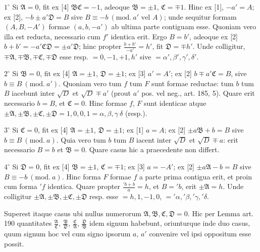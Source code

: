 $1^\circ$ Si $\mathfrak{A}=0$, fit ex [4] $\mathfrak{B}\mathfrak{C}=-1$, adeoque $\mathfrak{B}=\pm1$, $\mathfrak{C}=\mp1$. Hinc ex [1], $-a'=A$; ex [2], $-b\pm a'\mathfrak{D}=B$ sive $B\equiv-b\ (\mathrm{mod.}\ a'\text{ vel }A)$; unde sequitur formam $(A,B,-A')$ formae $(a,b,-a')$ ab ultima parte contiguam esse. Quoniam vero illa est reducta, necessario cum $f'$ identica erit. Ergo $B=b'$, adeoque ex [2] $b+b'=-a'\mathfrak{C}\mathfrak{D}=\pm a'\mathfrak{D}$; hinc propter $\frac{b+b'}{-a'}=h'$, fit $\mathfrak{D}=\mp h'$. Unde colligitur, $\mp\mathfrak{A},\mp\mathfrak{B},\mp\mathfrak{C},\mp\mathfrak{D}$ esse resp. $=0,-1,+1,h'$ sive $=\alpha',\beta',\gamma',\delta'$.

$2^\circ$ Si $\mathfrak{B}=0$, fit ex [4] $\mathfrak{A}=\pm1$, $\mathfrak{D}=\pm1$; ex [3] $a'=A'$; ex [2] $b\mp a'\mathfrak{C}=B$, sive $b\equiv B\ (\mathrm{mod.}\ a')$. Quoniam vero tum $f$ tum $F$ sunt formae reductae: tum $b$ tum $B$ iacebunt inter $\surd D$ et $\surd D\mp a'$ (prout $a'$ pos. vel neg., art. 185, 5). Quare erit necessario $b=B$, et $\mathfrak{C}=0$. Hinc formae $f$, $F$ sunt identicae atque $\pm\mathfrak{A},\pm\mathfrak{B},\pm\mathfrak{C},\pm\mathfrak{D}=1,0,0,1=\alpha,\beta,\gamma\ \delta$ (resp.).

$3^\circ$ Si $\mathfrak{C}=0$, fit ex [4] $\mathfrak{A}=\pm1$, $\mathfrak{D}=\pm1$; ex [1] $a=A$; ex [2] $\pm a\mathfrak{B}+b=B$ sive $b\equiv B\ (\mathrm{mod.}\ a)$. Quia vero tum $b$ tum $B$ iacent inter $\surd D$
et $\surd D\mp a$: erit necessario $B=b$ et $\mathfrak{B}=0$. Quare casus hic a praecedente non differt.

$4^\circ$ Si $\mathfrak{D}=0$, fit ex [4] $\mathfrak{B}=\pm1$, $\mathfrak{C}=\mp1$; ex [3] $a=-A'$; ex [2] $\pm a\mathfrak{A}-b=B$ sive $B\equiv-b\ (\mathrm{mod.}\ a)$. Hinc forma $F$ formae $f$ a parte prima contigua erit, et proin cum forma ${}'f$ identica. Quare propter $\frac{{}'b+b}{a}=h$, et $B={}'b$, erit $\pm\mathfrak{A}=h$. Unde colligitur $\pm\mathfrak{A},\pm\mathfrak{B},\pm\mathfrak{C},\pm\mathfrak{D}$ resp. esse $=h,1,-1,0$, $={}'\alpha,{}'\beta,{}'\gamma,{}'\delta$.

Superest itaque casus ubi nullus numerorum $\mathfrak{A},\mathfrak{B},\mathfrak{C},\mathfrak{D}=0$. Hic per Lemma art. 190 quantitates $\frac{\mathfrak{A}}{\mathfrak{C}}$, $\frac{\mathfrak{B}}{\mathfrak{D}}$, $\frac{\mathfrak{C}}{\mathfrak{A}}$, $\frac{\mathfrak{D}}{\mathfrak{B}}$ idem signum habebunt, oriunturque inde duo casus, quum signum hoc vel cum signo ipsorum $a$, $a'$ convenire vel ipsi oppositum esse possit.

